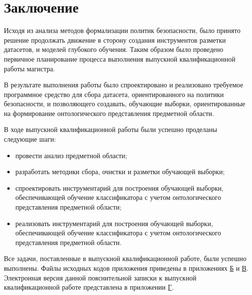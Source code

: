 \documentclass[../main]{subfiles}
\begin{document}
\newpage
{}
{}
\section*{Заключение}

Исходя из анализа методов формализации политик безопасности, было принято решение продолжать движение в сторону создания инструментов разметки датасетов, и моделей глубокого обучения. Таким образом было проведено первичное планирование процесса выполнения выпускной квалификационной работы магистра.

В результате выполнения работы было спроектировано и реализовано требуемое программное средство для сбора датасета, ориентированного на политики безопасности, и позволяющего создавать, обучающие выборки, ориентированные на формирование онтологического представления предметной области.

В ходе выпускной квалификационной работы были успешно проделаны следующие шаги:

\begin{itemize}
    \item провести анализ предметной области;
    \item разработать методики сбора, очистки и разметки обучающей выборки;
    \item спроектировать инструментарий для построения обучающей выборки, обеспечивающей обучение классификатора с учетом онтологического представления предметной области;
    \item реализовать  инструментарий для построения обучающей выборки, обеспечивающей обучение классификатора с учетом онтологического представления предметной области.
\end{itemize}

Все задачи, поставленные в выпускной квалификационной работе, были успешно выполнены. Файлы исходных кодов приложения приведены в приложениях \hyperref[sec:appendix2]{Б} и \hyperref[sec:appendix3]{В}.  Электронная  версия  данной  пояснительной  записки  к выпускной квалификационной работе представлена в приложении \hyperref[sec:appendix4]{Г}.
\end{document}
